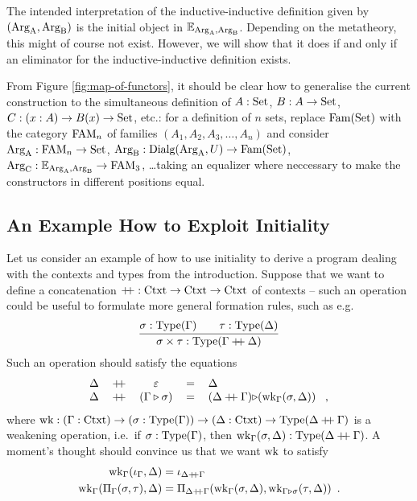 \documentclass[orivec,envcountsame, ,envcountsect]{llncs}
\begin{document}
\begin{remark}
  The intended interpretation of the inductive-inductive definition
  given by $(\text{Arg}_{\text{A}}, \text{Arg}_{\text{B}})$ is the initial object in
  $\mathbb{E}_{\text{Arg}_{\text{A}}, \text{Arg}_{\text{B}}}$. Depending on the metatheory, this might of
  course not exist. However, we will show that it does if and only if
  an eliminator for the inductive-inductive definition exists.
\end{remark}

\begin{remark} %
  From Figure \ref{fig:map-of-functors}, it should be clear how to
  generalise the current construction to the simultaneous definition
  of $A : \text{Set}$, $B : A \to \text{Set}$, $C : {(x : A)} \to B(x) \to \text{Set}$,
  etc.: for a definition of $n$ sets, replace $\text{Fam}(\text{Set})$ with the category $\text{FAM}_n$ of families $(A_1, A_2, A_3, \ldots, A_n)$ and
  consider $\text{Arg}_{\text{A}} : \text{FAM}_n \to \text{Set}$, $\text{Arg}_{\text{B}} : \text{Dialg}(\text{Arg}_{\text{A}}, U) \to
  \text{Fam}(\text{Set})$, $\text{Arg}_{\text{C}} : \mathbb{E}_{\text{Arg}_{\text{A}}, \text{Arg}_{\text{B}}} \to \text{FAM}_3$, \ldots taking an
  equalizer where neccessary to make the constructors in different
  positions equal.
\end{remark}

\subsection{An Example How to Exploit Initiality}
\label{sec:exploit-init}

Let us consider an example of how to use initiality to
derive %
a program dealing with the contexts and types from the introduction.
Suppose that we want to define a concatenation $\mathbin{+\mkern-6mu+} : \text{Ctxt}
\to \text{Ctxt} \to \text{Ctxt}$ of contexts -- such an operation could be useful
to formulate more general
formation rules, such as e.g.\
\[
\infer{\sigma \times \tau : \Type(\Gamma \concatCtxt \Delta)}{\sigma : \Type(\Gamma) \quad & \tau : \Type(\Delta)}
\]
Such an operation should satisfy the equations
\[
\begin{tabular}{lcccl}
  $\Delta$ & $\concatCtxt$ & $\emptyCtxt$ & $=$ & $\Delta$ \\
  $\Delta$ & $\concatCtxt$ & $(\consCtxt{\Gamma}{\sigma})$ & $=$ & $\consCtxt{(\Delta \concatCtxt \Gamma)}{$(\wkapp{\Gamma}{\Delta}{\sigma})$}$ \enspace ,
\end{tabular}
\]
where $\text{wk} : (\Gamma : \text{Ctxt}) \to (\sigma : \text{Type}(\Gamma)) \to (\Delta
: \text{Ctxt}) \to \text{Type}(\Delta \mathbin{+\mkern-6mu+} \Gamma)$ is a weakening
operation, i.e.\ if $\sigma : \text{Type}(\Gamma)$, then
$\text{wk}_{\Gamma}(\sigma, \Delta) : \text{Type}(\Delta \mathbin{+\mkern-6mu+} \Gamma)$. A
moment's thought should convince us that we want $\text{wk}$ to satisfy
\begin{align*}
  \text{wk}_{\Gamma}(\iota_{\Gamma}, \Delta) &= \iota_{\Delta \mathbin{+\mkern-6mu+} \Gamma} \\
  \text{wk}_{\Gamma}(\Pi_{\Gamma}(\sigma, \tau), \Delta) &= \Pi_{\Delta \mathbin{+\mkern-6mu+} \Gamma}(\text{wk}_{\Gamma}(\sigma, \Delta), \text{wk}_{\Gamma \triangleright \sigma}(\tau, \Delta)) \enspace .
\end{align*}
\end{document}
